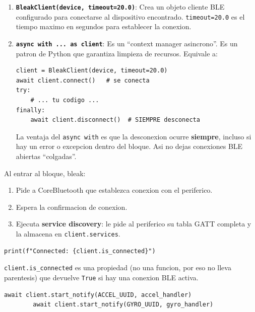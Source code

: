 \documentclass[11pt,a4paper]{article}
\begin{document}
\begin{enumerate}
    \item \textbf{\texttt{BleakClient(device, timeout=20.0)}}:
          Crea un objeto cliente BLE configurado para conectarse
          al dispositivo encontrado. \texttt{timeout=20.0} es el
          tiempo maximo en segundos para establecer la conexion.

    \item \textbf{\texttt{async with ... as client}}: Es un
          ``context manager asincrono''. Es un patron de Python que
          garantiza limpieza de recursos. Equivale a:

\begin{lstlisting}[style=python]
client = BleakClient(device, timeout=20.0)
await client.connect()   # se conecta
try:
    # ... tu codigo ...
finally:
    await client.disconnect()  # SIEMPRE desconecta
\end{lstlisting}

          La ventaja del \texttt{async with} es que la desconexion
          ocurre \textbf{siempre}, incluso si hay un error o
          excepcion dentro del bloque. Asi no dejas conexiones BLE
          abiertas ``colgadas''.
\end{enumerate}

Al entrar al bloque, bleak:
\begin{enumerate}
    \item Pide a CoreBluetooth que establezca conexion con el
          periferico.
    \item Espera la confirmacion de conexion.
    \item Ejecuta \textbf{service discovery}: le pide al periferico
          su tabla GATT completa y la almacena en
          \texttt{client.services}.
\end{enumerate}

\begin{lstlisting}[style=python]
        print(f"Connected: {client.is_connected}")
\end{lstlisting}

\texttt{client.is\_connected} es una propiedad (no una funcion,
por eso no lleva parentesis) que devuelve \texttt{True} si hay una
conexion BLE activa.

\begin{lstlisting}[style=python]
        await client.start_notify(ACCEL_UUID, accel_handler)
        await client.start_notify(GYRO_UUID, gyro_handler)
\end{lstlisting}
\end{document}
